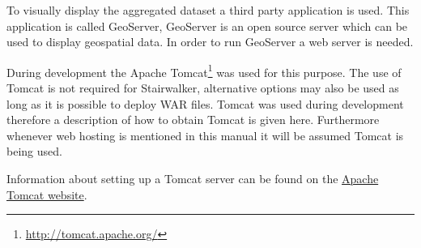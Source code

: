To visually display the aggregated dataset a third party application is used. This application is called GeoServer, GeoServer is an open source server which can be used to display geospatial data. In order to run GeoServer a web server is needed. 

During development the Apache Tomcat\footnote{\url{http://tomcat.apache.org/}} was used for this purpose. The use of Tomcat is not required for Stairwalker, alternative options may also be used as long as it is possible to deploy WAR files. Tomcat was used during development therefore a description of how to obtain Tomcat is given here. Furthermore whenever web hosting is mentioned in this manual it will be assumed Tomcat is being used.

Information about setting up a Tomcat server can be found on the \href{http://tomcat.apache.org/}{Apache Tomcat website}.